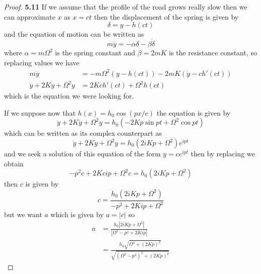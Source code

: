 \documentclass[11pt]{article}
\theoremstyle{definition}
\begin{document}
	\begin{proof}{\textbf{5.11}}
        If we assume that the profile of the road grows really slow then we can
        approximate $x$ as $x = ct$ then the displacement of the spring is 
        given by
        $$\delta = y - h(ct)$$
        and the equation of motion can be written as
        $$m\ddot{y} = -\alpha\delta - \beta\dot{\delta}$$
        where $\alpha = m\Omega^2$ is the spring constant and $\beta = 2mK$ is
        the resistance constant, so replacing values we have
        \begin{align*}
            m\ddot{y} &= -m\Omega^2(y - h(ct)) - 2mK(\dot{y} - ch'(ct)) \\
            \ddot{y} + 2K\dot{y} + \Omega^2y &= 2Kch'(ct) + \Omega^2h(ct)
        \end{align*}
        which is the equation we were looking for.
        
        If we suppose now that $h(x) = h_0 \cos(px/c)$ the equation is given by
        $$\ddot{y} + 2K\dot{y} + \Omega^2y = h_0(-2Kp\sin{pt} + \Omega^2\cos{pt})$$
        which can be written as its complex counterpart as
        $$\ddot{y} + 2K\dot{y} + \Omega^2y = h_0(2iKp+\Omega^2)e^{ipt}$$
        and we seek a solution of this equation of the form $y = ce^{ipt}$ then
        by replacing we obtain
        $$-p^2c + 2Kcip + \Omega^2c = h_0(2iKp + \Omega^2)$$
        then $c$ is given by
        $$c = \frac{h_0(2iKp + \Omega^2)}{-p^2 + 2Kip + \Omega^2}$$
        but we want $a$ which is given by $a = |c|$ so
        \begin{align*}
            a &= \frac{h_0|2iKp + \Omega^2|}{|\Omega^2 -p^2 + 2Kip|} \\
              &= \frac{h_0\sqrt{\Omega^4 + (2Kp)^2}}{\sqrt{(\Omega^2-p^2)^2 + (2Kp)^2}}            
        \end{align*}


\end{proof}
\end{document}
